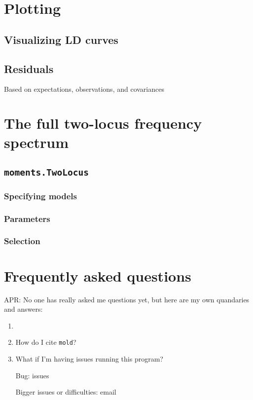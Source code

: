 \documentclass[11pt]{article}
\newcommand{\comment}[1]{{\color{blue}APR: #1}}
\newcommand{\mold}{\texttt{mold}\xspace}
\begin{document}
\section{Plotting}

\subsection{Visualizing LD curves}


\subsection{Residuals}
Based on expectations, observations, and covariances


\section{The full two-locus frequency spectrum}

\subsection{\texttt{moments.TwoLocus}}

\subsubsection{Specifying models}

\subsubsection{Parameters}

\subsubsection{Selection}


\section{Frequently asked questions}

\comment{No one has really asked me questions yet, but here are my own quandaries and answers:}

\begin{enumerate}

\item 

\item How do I cite \mold?

\item What if I'm having issues running this program?

Bug: issues

Bigger issues or difficulties: email

\end{enumerate}
\end{document}
